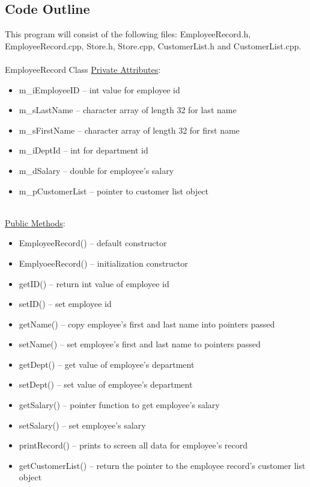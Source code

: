 \documentclass[12pt]{article}%
\begin{document}
\subsection{Code Outline}
This program will consist of the following files: EmployeeRecord.h, EmployeeRecord.cpp, Store.h, Store.cpp,
CustomerList.h and CustomerList.cpp.
\hfill\\
\hfill\\
EmployeeRecord Class
\underline{Private Attributes}:
\begin{itemize}
    \item m\_iEmployeeID -- int value for employee id
    \item m\_sLastName -- character array of length 32 for last name
    \item m\_sFirstName -- character array of length 32 for first name
    \item m\_iDeptId -- int for department id
    \item m\_dSalary -- double for employee's salary
    \item m\_pCustomerList -- pointer to customer list object
    \end{itemize}
    \hfill\\
\underline{Public Methods}:
\begin{itemize}
    \item EmployeeRecord() -- default constructor
    \item EmplyoeeRecord() -- initialization constructor
    \item getID() -- return int value of employee id
    \item setID() -- set employee id
    \item getName() -- copy employee's first and last name into pointers passed
    \item setName() -- set employee's first and last name to pointers passed
    \item getDept() -- get value of employee's department
    \item setDept() -- set value of employee's department
    \item getSalary() -- pointer function to get employee's salary
    \item setSalary() -- set employee's salary
    \item printRecord() -- prints to screen all data for employee's record
    \item getCustomerList() -- return the pointer to the employee record's customer list object
\end{itemize}
\end{document}
